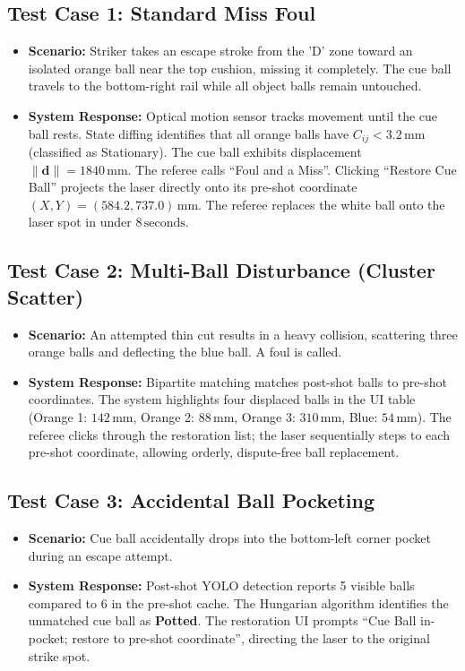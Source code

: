 \subsection{Test Case 1: Standard Miss Foul}
\begin{itemize}
    \item \textbf{Scenario:} Striker takes an escape stroke from the 'D' zone toward an isolated orange ball near the top cushion, missing it completely. The cue ball travels to the bottom-right rail while all object balls remain untouched.
    \item \textbf{System Response:} Optical motion sensor tracks movement until the cue ball rests. State diffing identifies that all orange balls have $C_{ij} < 3.2\,\text{mm}$ (classified as Stationary). The cue ball exhibits displacement $\|\mathbf{d}\| = 1840\,\text{mm}$. The referee calls ``Foul and a Miss''. Clicking ``Restore Cue Ball'' projects the laser directly onto its pre-shot coordinate $(X, Y) = (584.2, 737.0)\,\text{mm}$. The referee replaces the white ball onto the laser spot in under $8\,\text{seconds}$.
\end{itemize}

\subsection{Test Case 2: Multi-Ball Disturbance (Cluster Scatter)}
\begin{itemize}
    \item \textbf{Scenario:} An attempted thin cut results in a heavy collision, scattering three orange balls and deflecting the blue ball. A foul is called.
    \item \textbf{System Response:} Bipartite matching matches post-shot balls to pre-shot coordinates. The system highlights four displaced balls in the UI table (Orange 1: $142\,\text{mm}$, Orange 2: $88\,\text{mm}$, Orange 3: $310\,\text{mm}$, Blue: $54\,\text{mm}$). The referee clicks through the restoration list; the laser sequentially steps to each pre-shot coordinate, allowing orderly, dispute-free ball replacement.
\end{itemize}

\subsection{Test Case 3: Accidental Ball Pocketing}
\begin{itemize}
    \item \textbf{Scenario:} Cue ball accidentally drops into the bottom-left corner pocket during an escape attempt.
    \item \textbf{System Response:} Post-shot YOLO detection reports 5 visible balls compared to 6 in the pre-shot cache. The Hungarian algorithm identifies the unmatched cue ball as \textbf{Potted}. The restoration UI prompts ``Cue Ball in-pocket; restore to pre-shot coordinate'', directing the laser to the original strike spot.
\end{itemize}

